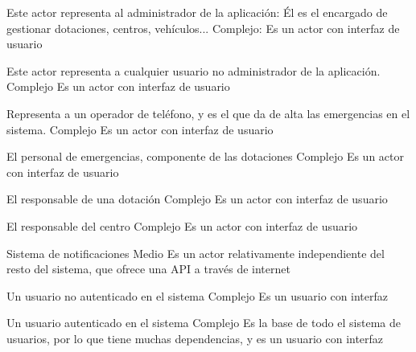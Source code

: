 {\reportauthors}
{}
{Este actor representa al administrador de la aplicación: Él es el encargado de gestionar dotaciones, centros, vehículos...}
{Complejo: Es un actor con interfaz de usuario}

{\reportauthors}
{}
{Este actor representa a cualquier usuario no administrador de la aplicación.}
{Complejo}
{Es un actor con interfaz de usuario}

{\reportauthors}
{}
{Representa a un operador de teléfono, y es el que da de alta las emergencias en el sistema.}
{Complejo}
{Es un actor con interfaz de usuario}

{\reportauthors}
{}
{El personal de emergencias, componente de las dotaciones}
{Complejo}
{Es un actor con interfaz de usuario}

{\reportauthors}
{}
{El responsable de una dotación}
{Complejo}
{Es un actor con interfaz de usuario}

{\reportauthors}
{}
{El responsable del centro}
{Complejo}
{Es un actor con interfaz de usuario}

{\reportauthors}
{}
{Sistema de notificaciones}
{Medio}
{Es un actor relativamente independiente del resto del sistema, que ofrece
una API a través de internet}

{\reportauthors}
{}
{Un usuario no autenticado en el sistema}
{Complejo}
{Es un usuario con interfaz}

{\reportauthors}
{}
{Un usuario autenticado en el sistema}
{Complejo}
{Es la base de todo el sistema de usuarios, por lo que tiene muchas
dependencias, y es un usuario con interfaz}

